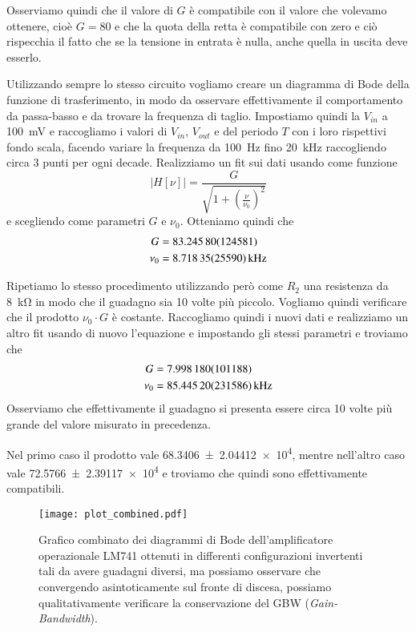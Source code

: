 \documentclass[
    rmp,
    reprint, 
    superscriptaddress, 
    altaffilletter, 
    amsmath, 
    amssymb,
    a4paper]{revtex4-2}
\begin{document}
Osserviamo quindi che il valore di $G$ è compatibile con il valore che volevamo ottenere, cioè $G=80$ e che la quota della retta è compatibile con zero e ciò rispecchia il fatto che se la tensione in entrata è nulla, anche quella in uscita deve esserlo.

Utilizzando sempre lo stesso circuito vogliamo creare un diagramma di Bode della funzione di trasferimento, in modo da osservare effettivamente il comportamento da passa-basso e da trovare la frequenza di taglio. Impostiamo quindi la $V_{in}$ a \SI{100}{\milli\volt} e raccogliamo i valori di $V_{in}$, $V_{out}$ e del periodo $T$ con i loro rispettivi fondo scala, facendo variare la frequenza da \SI{100}{\hertz} fino \SI{20}{\kilo\hertz} raccogliendo circa 3 punti per ogni decade. Realizziamo un fit sui dati usando come funzione  \begin{equation}\left|H[\nu]\right|=\frac{G}{\sqrt{1+\left(\frac{\nu}{\nu_0}\right)^2}} \label{eq:H}\end{equation} e scegliendo come parametri $G$ e $\nu_0$. 
Otteniamo quindi che
\begin{align*}
    G     &=\num{ 83.2458 +- 1.24581} \\
    \nu_0 &=\SI{8.71835 +- 0.2559}{\kilo\hertz} \\ 
\end{align*}

Ripetiamo lo stesso procedimento utilizzando però come $R_2$ una resistenza da \SI{8}{\kilo\ohm} in modo che il guadagno sia 10 volte più piccolo. Vogliamo quindi verificare che il prodotto $\nu_0 \cdot G $ è costante. Raccogliamo quindi i nuovi dati e realizziamo un altro fit usando di nuovo l'equazione  e impostando gli stessi parametri e troviamo che
\begin{align*}
    G     &=\num{7.99818 +- 0.101188} \\
    \nu_0 &=\SI{85.4452 +- 2.31586}{\kilo\hertz} \\ 
\end{align*}
Osserviamo che effettivamente il guadagno si presenta essere circa 10 volte più grande del valore misurato in precedenza.

Nel primo caso il prodotto vale \num{68.3406 +- 2.04412e4}, mentre nell'altro caso vale \num{72.5766 +- 2.39117e4} e troviamo che quindi sono effettivamente compatibili.

\begin{figure}
    \texttt{[image: plot\_combined.pdf]}
    \caption{Grafico combinato dei diagrammi di Bode dell'amplificatore operazionale LM741 ottenuti in differenti configurazioni invertenti tali da avere guadagni diversi, ma possiamo osservare che convergendo asintoticamente sul fronte di discesa, possiamo qualitativamente verificare la conservazione del GBW (\emph{Gain-Bandwidth}).}
    \label{fig:plot_combined}
\end{figure}
\end{document}
